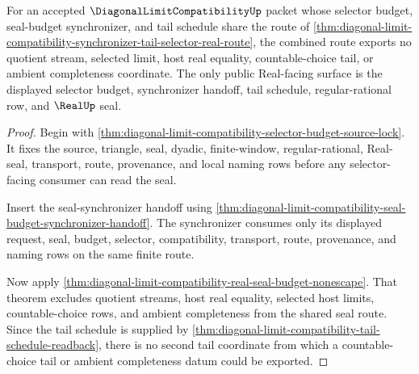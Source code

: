\begin{theorem}
\label{thm:diagonal-limit-compatibility-selector-budget-shared-tail-nonescape}
For an accepted $\DiagonalLimitCompatibilityUp$ packet whose selector budget, seal-budget synchronizer, and tail schedule share the route of \autoref{thm:diagonal-limit-compatibility-synchronizer-tail-selector-real-route}, the combined route exports no quotient stream, selected limit, host real equality, countable-choice tail, or ambient completeness coordinate. The only public Real-facing surface is the displayed selector budget, synchronizer handoff, tail schedule, regular-rational row, and $\RealUp$ seal.
\end{theorem}
\begin{proof}
Begin with \autoref{thm:diagonal-limit-compatibility-selector-budget-source-lock}. It fixes the source, triangle, seal, dyadic, finite-window, regular-rational, Real-seal, transport, route, provenance, and local naming rows before any selector-facing consumer can read the seal.

Insert the seal-synchronizer handoff using \autoref{thm:diagonal-limit-compatibility-seal-budget-synchronizer-handoff}. The synchronizer consumes only its displayed request, seal, budget, selector, compatibility, transport, route, provenance, and naming rows on the same finite route.

Now apply \autoref{thm:diagonal-limit-compatibility-real-seal-budget-nonescape}. That theorem excludes quotient streams, host real equality, selected host limits, countable-choice rows, and ambient completeness from the shared seal route. Since the tail schedule is supplied by \autoref{thm:diagonal-limit-compatibility-tail-schedule-readback}, there is no second tail coordinate from which a countable-choice tail or ambient completeness datum could be exported.
\end{proof}

